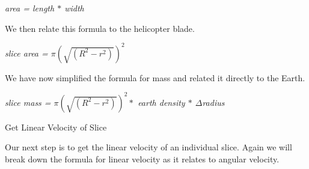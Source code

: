 \documentclass[a4paper, 11pt, oneside]{book} %
\begin{document}
\vspace{0.5\baselineskip} %
\vspace{0.5\baselineskip} %

\textit{area = length $*$ width}\\

\vspace{0.5\baselineskip} %
\vspace{0.5\baselineskip} %

We then relate this formula to the helicopter blade.\\

\vspace{0.5\baselineskip} %
\vspace{0.5\baselineskip} %

\textit{slice area = $\pi(\sqrt{(R^2-r^2)})^2$}\\

\vspace{0.5\baselineskip} %
\vspace{0.5\baselineskip} %

We have now simplified the formula for mass and related it directly to the Earth.\\

\vspace{0.5\baselineskip} %
\vspace{0.5\baselineskip} %

\textit{slice mass = $\pi(\sqrt{(R^2-r^2)})^2 * $ earth density $*$ $\Delta$radius}\\

\vspace{0.5\baselineskip} %
\vspace{0.5\baselineskip} %

{\LARGE Get Linear Velocity of Slice \\} %
\vspace{0.5\baselineskip} %
\vspace{0.5\baselineskip} %

Our next step is to get the linear velocity of an individual slice. Again we will break down the formula for linear velocity as it relates to angular velocity.\\
\end{document}
